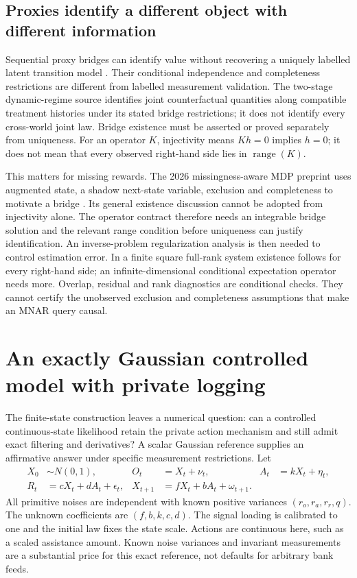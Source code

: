 \subsection{Proxies identify a different object with different information}
Sequential proxy bridges can identify value without recovering a uniquely
labelled latent transition model \citep{bennettprox2023,zhangprox2024}.
Their conditional independence and completeness restrictions are different
from labelled measurement validation. The two-stage dynamic-regime source
identifies joint counterfactual quantities along compatible treatment
histories under its stated bridge restrictions; it does not identify every
cross-world joint law. Bridge existence must be asserted or proved separately
from uniqueness. For an operator $K$, injectivity means $Kh=0$ implies
$h=0$; it does not mean that every observed right-hand side lies in
$\operatorname{range}(K)$.

This matters for missing rewards. The 2026 missingness-aware MDP preprint
uses augmented state, a shadow next-state variable, exclusion and completeness
to motivate a bridge \citep[Assumptions 3.1--3.4, Theorem 3.6]{wei2026}.
Its general existence discussion cannot be adopted from injectivity alone.
The operator contract therefore needs an integrable bridge solution and
the relevant range condition before uniqueness can justify identification.
An inverse-problem regularization analysis is then needed to control
estimation error. In a finite square full-rank system
existence follows for every right-hand side; an infinite-dimensional
conditional expectation operator needs more. Overlap, residual and rank
diagnostics are conditional checks. They cannot certify the unobserved
exclusion and completeness assumptions that make an MNAR query causal.


\section{An exactly Gaussian controlled model with private logging}
\label{s5:continuous-controlled}
The finite-state construction leaves a numerical question: can a controlled
continuous-state likelihood retain the private action mechanism and still
admit exact filtering and derivatives? A scalar Gaussian reference supplies
an affirmative answer under specific measurement restrictions. Let
\begin{align}
 X_0&\sim N(0,1), & O_t&=X_t+\nu_t, & A_t&=kX_t+\eta_t,\\
 R_t&=cX_t+dA_t+\epsilon_t, &
 X_{t+1}&=fX_t+bA_t+\omega_{t+1}.
 \label{s5:gaussian-private-law}
\end{align}
All primitive noises are independent with known positive variances
$(r_o,r_a,r_r,q)$. The unknown coefficients are $(f,b,k,c,d)$.
The signal loading is calibrated to one and the initial law fixes the state
scale. Actions are continuous here, such as a scaled assistance amount.
Known noise variances and invariant measurements are a substantial price for
this exact reference, not defaults for arbitrary bank feeds.

